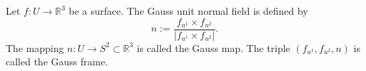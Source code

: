 Let $f: U \to \mathbb{R}^3$ be a surface. The Gauss unit normal field is defined by
$$n := \frac{f_{u^1} \times f_{u^2}}{|f_{u^1} \times f_{u^2}|}.$$
The mapping $n: U \to S^2 \subset \mathbb{R}^3$ is called the Gauss map. The triple $(f_{u^1}, f_{u^2}, n)$ is called the Gauss frame.